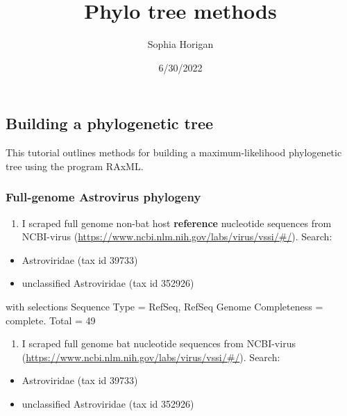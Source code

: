 \documentclass[
]{article}
\title{Phylo tree methods}
\author{Sophia Horigan}
\date{6/30/2022}
\providecommand{\tightlist}{%
  \setlength{\itemsep}{0pt}\setlength{\parskip}{0pt}}
\begin{document}
\maketitle

\hypertarget{building-a-phylogenetic-tree}{%
\subsection{Building a phylogenetic
tree}\label{building-a-phylogenetic-tree}}

This tutorial outlines methods for building a maximum-likelihood
phylogenetic tree using the program RAxML.

\hypertarget{full-genome-astrovirus-phylogeny}{%
\subsubsection{Full-genome Astrovirus
phylogeny}\label{full-genome-astrovirus-phylogeny}}

\begin{enumerate}
\def\labelenumi{\arabic{enumi}.}
\tightlist
\item
  I scraped full genome non-bat host \textbf{reference} nucleotide
  sequences from NCBI-virus
  (\url{https://www.ncbi.nlm.nih.gov/labs/virus/vssi/\#/}). Search:
\end{enumerate}

\begin{itemize}
\tightlist
\item
  Astroviridae (tax id 39733)
\item
  unclassified Astroviridae (tax id 352926)
\end{itemize}

with selections Sequence Type = RefSeq, RefSeq Genome Completeness =
complete. Total = 49

\begin{enumerate}
\def\labelenumi{\arabic{enumi}.}
\setcounter{enumi}{1}
\tightlist
\item
  I scraped full genome bat nucleotide sequences from NCBI-virus
  (\url{https://www.ncbi.nlm.nih.gov/labs/virus/vssi/\#/}). Search:
\end{enumerate}

\begin{itemize}
\tightlist
\item
  Astroviridae (tax id 39733)
\item
  unclassified Astroviridae (tax id 352926)
\end{itemize}
\end{document}
